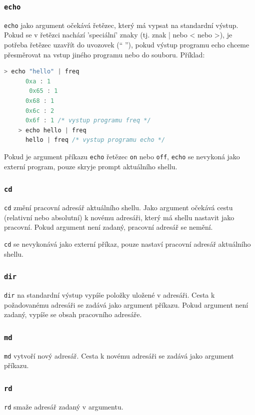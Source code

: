 \documentclass[12pt, a4paper]{article}
\begin{document}
    \subsubsection*{\texttt{echo}}
    \texttt{echo} jako argument očekává řetězec, který má vypsat na standardní výstup. Pokud se v řetězci nachází 'speciální' znaky (tj. znak | nebo < nebo >), je potřeba řetězec uzavřít do uvozovek (`` ''), pokud výstup programu echo chceme přesměrovat na vstup jiného programu nebo do souboru.
    Příklad:
    \begin{lstlisting}[language=C, caption={Ukázka chování programu echo},captionpos=b]
    > echo "hello" | freq
      0xa : 1
	   0x65 : 1
      0x68 : 1
      0x6c : 2
      0x6f : 1 /* vystup programu freq */
    > echo hello | freq
      hello | freq /* vystup programu echo */
    \end{lstlisting}
    
    Pokud je argument příkazu \texttt{echo} řetězec \texttt{on} nebo \texttt{off}, \texttt{echo} se nevykoná jako externí program, pouze skryje prompt aktuálního shellu.
    
    \subsubsection*{\texttt{cd}}
    \texttt{cd} změní pracovní adresář aktuálního shellu. Jako argument očekává cestu (relativní nebo absolutní) k novému adresáři, který má shellu nastavit jako pracovní. Pokud argument není zadaný, pracovní adresář se nemění.
    
    \texttt{cd} se nevykonává jako externí příkaz, pouze nastaví pracovní adresář aktuálního shellu.
    
    \subsubsection*{\texttt{dir}}
    \texttt{dir} na standardní výstup vypíše položky uložené v adresáři. Cesta k požadovanému adresáři se zadává jako argument příkazu. Pokud argument není zadaný, vypíše se obsah pracovního adresáře.
    
    \subsubsection*{\texttt{md}}
    \texttt{md} vytvoří nový adresář. Cesta k novému adresáři se zadává jako argument příkazu.
    
    \subsubsection*{\texttt{rd}}
    \texttt{rd} smaže adresář zadaný v argumentu.
    
\end{document}
